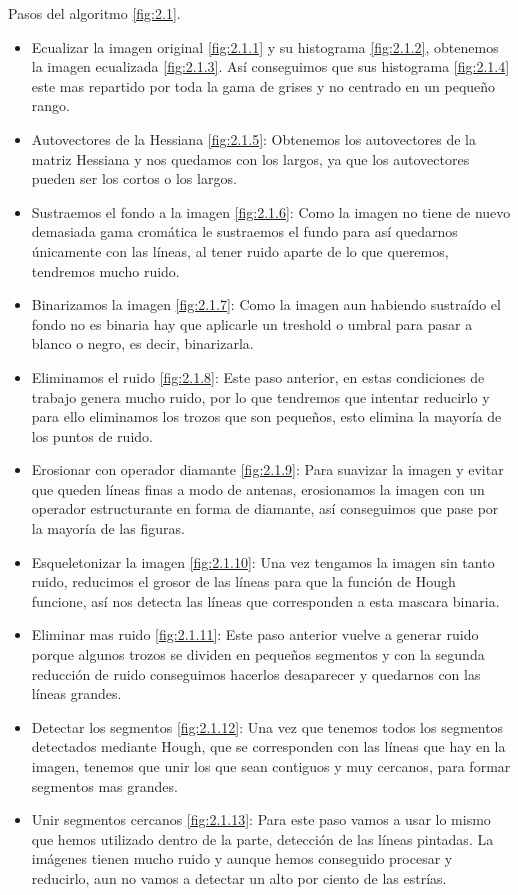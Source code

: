 Pasos del algoritmo \ref{fig:2.1}.
\begin{itemize}
	\item Ecualizar la imagen original \ref{fig:2.1.1} y su histograma \ref{fig:2.1.2}, obtenemos la imagen ecualizada \ref{fig:2.1.3}.
Así conseguimos que sus histograma \ref{fig:2.1.4} este mas repartido por toda la gama de grises y no centrado en un pequeño rango.
	\item Autovectores de la Hessiana \ref{fig:2.1.5}:
Obtenemos los autovectores de la matriz Hessiana y nos quedamos con los largos, ya que los autovectores pueden ser los cortos o los largos. 
	\item Sustraemos el fondo a la imagen \ref{fig:2.1.6}:
Como la imagen no tiene de nuevo demasiada gama cromática le sustraemos el fundo para así quedarnos únicamente con las líneas, al tener ruido aparte de lo que queremos, tendremos mucho ruido.
	\item Binarizamos la imagen \ref{fig:2.1.7}:
Como la imagen aun habiendo sustraído el fondo no es binaria hay que aplicarle un treshold o umbral para pasar a blanco o negro, es decir, binarizarla.
	\item Eliminamos el ruido \ref{fig:2.1.8}:
Este paso anterior, en estas condiciones de trabajo genera mucho ruido, por lo que tendremos que intentar reducirlo y para ello eliminamos los trozos que son pequeños, esto elimina la mayoría de los puntos de ruido.
	\item Erosionar con operador diamante \ref{fig:2.1.9}:
Para suavizar la imagen y evitar que queden líneas finas a modo de antenas, erosionamos la imagen con un operador estructurante en forma de diamante, así conseguimos que pase por la mayoría de las figuras.
	\item Esqueletonizar la imagen \ref{fig:2.1.10}:
Una vez tengamos la imagen sin tanto ruido, reducimos el grosor de las líneas para que la función de Hough funcione, así nos detecta las líneas que corresponden a esta mascara binaria.
	\item Eliminar mas ruido \ref{fig:2.1.11}:
Este paso anterior vuelve a generar ruido porque algunos trozos se dividen en pequeños segmentos y con la segunda reducción de ruido conseguimos hacerlos desaparecer y quedarnos con las líneas grandes.
	\item Detectar los segmentos \ref{fig:2.1.12}:
Una vez que tenemos todos los segmentos detectados mediante Hough, que se corresponden con las líneas que hay en la imagen, tenemos que unir los que sean contiguos y muy cercanos, para formar segmentos mas grandes.
	\item Unir segmentos cercanos \ref{fig:2.1.13}:
Para este paso vamos a usar lo mismo que hemos utilizado dentro de la parte, detección de las líneas pintadas.
La imágenes tienen mucho ruido y aunque hemos conseguido procesar y reducirlo, aun no vamos a detectar un alto por ciento de las estrías.
\end{itemize}




